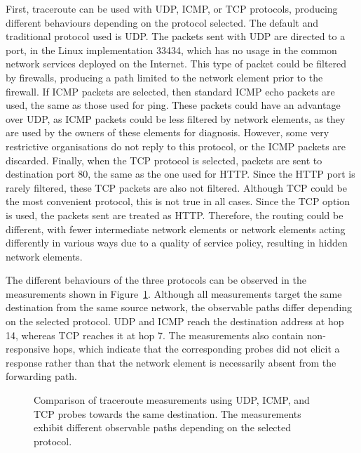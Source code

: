 First, traceroute can be used with UDP, ICMP, or TCP protocols, producing different behaviours depending on the protocol selected. The default and traditional protocol used is UDP. The packets sent with UDP are directed to a port, in the Linux implementation \cite{Traceroute8Page} 33434, which has no usage in the common network services deployed on the Internet. This type of packet could be filtered by firewalls, producing a path limited to the network element prior to the firewall. If ICMP packets are selected, then standard ICMP echo packets are used, the same as those used for ping. These packets could have an advantage over UDP, as ICMP packets could be less filtered by network elements, as they are used by the owners of these elements for diagnosis. However, some very restrictive organisations do not reply to this protocol, or the ICMP packets are discarded. Finally, when the TCP protocol is selected, packets are sent to destination port 80, the same as the one used for HTTP. Since the HTTP port is rarely filtered, these TCP packets are also not filtered. Although TCP could be the most convenient protocol, this is not true in all cases. Since the TCP option is used, the packets sent are treated as HTTP. Therefore, the routing could be different, with fewer intermediate network elements or network elements acting differently in various ways due to a quality of service policy, resulting in hidden network elements.

The different behaviours of the three protocols can be observed in the measurements shown in Figure~\ref{fig:hunter_traceroute_protocols_examples}. Although all measurements target the same destination from the same source network, the observable paths differ depending on the selected protocol. UDP and ICMP reach the destination address at hop 14, whereas TCP reaches it at hop 7. The measurements also contain non-responsive hops, which indicate that the corresponding probes did not elicit a response rather than that the network element is necessarily absent from the forwarding path.

\begin{figure}[t]
    \centering
    
    \caption{Comparison of traceroute measurements using UDP, ICMP, and TCP probes towards the same destination. The measurements exhibit different observable paths depending on the selected protocol.}
    \label{fig:hunter_traceroute_protocols_examples}
\end{figure}

